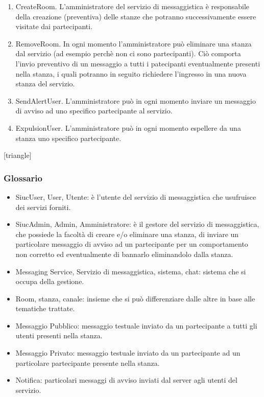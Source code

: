 \documentclass[t]{beamer} %
\let\olditem=\item%
\renewcommand{\item}{\olditem \justifying}%
\begin{document}
\begin{frame} [allowframebreaks]
\begin{enumerate}
          stanza del servizio cui era precedentemente associato l’utente.
    \item CreateRoom. L’amministratore del servizio di messaggistica è responsabile della creazione (preventiva) delle stanze che potranno successivamente essere 
          visitate dai partecipanti.
    \item RemoveRoom. In ogni momento l’amministratore può eliminare una stanza dal servizio (ad esempio perchè non ci sono partecipanti). Ciò comporta l’invio 
          preventivo di un messaggio a tutti i patecipanti eventualmente presenti nella stanza, i quali potranno in seguito richiedere l’ingresso in una   
          nuova stanza del servizio.
    \item SendAlertUser. L’amministratore può in ogni momento inviare un messaggio di avviso ad uno specifico partecipante al servizio.
    \item ExpulsionUser. L’amministratore può in ogni momento espellere da una stanza uno specifico partecipante.  
   \end{enumerate}
\end{frame}

[triangle]
\begin{frame} [allowframebreaks]
  \frametitle{Glossario} 
   \begin{itemize} 
    \item SiucUser, User, Utente: è l'utente del servizio di messaggistica che usufruisce dei servizi forniti.
    \item SiucAdmin, Admin, Amministratore: è il gestore del servizio di messaggistica, che possiede la facoltà di creare e/o eliminare una stanza, di inviare un 
          particolare messaggio di avviso ad un partecipante per un comportamento non corretto ed eventualmente di bannarlo eliminandolo dalla stanza.
    \item Messaging Service, Servizio di messaggistica, sistema, chat: sistema che si occupa della gestione.
    \item Room, stanza, canale: insieme che si può differenziare dalle altre in base alle tematiche trattate.
    \item Messaggio Pubblico: messaggio testuale inviato da un partecipante a tutti gli utenti presenti nella stanza.
    \item Messaggio Privato: messaggio testuale inviato da un partecipante ad un particolare partecipante presente nella stanza.
    \item Notifica: particolari messaggi di avviso inviati dal server agli utenti del servizio.  
  \end{itemize}
\end{frame}
\end{document}
